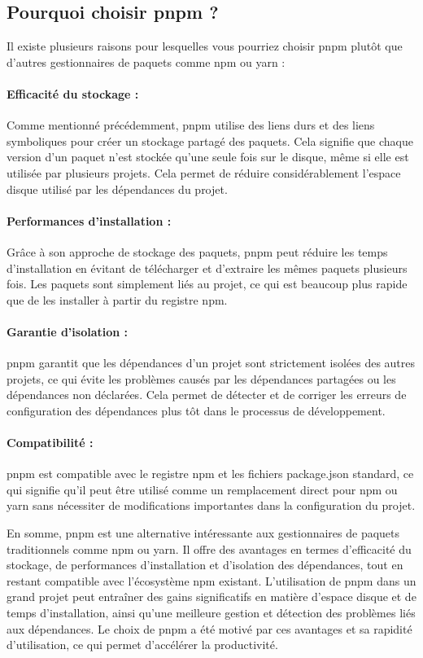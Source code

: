 \subsection{Pourquoi choisir pnpm ?}

Il existe plusieurs raisons pour lesquelles vous pourriez choisir pnpm plutôt que d'autres gestionnaires de paquets comme npm ou yarn :

\paragraph{Efficacité du stockage :} Comme mentionné précédemment, pnpm utilise des liens durs et des liens symboliques pour créer un stockage partagé des paquets. Cela signifie que chaque version d'un paquet n'est stockée qu'une seule fois sur le disque, même si elle est utilisée par plusieurs projets. Cela permet de réduire considérablement l'espace disque utilisé par les dépendances du projet.
\paragraph{Performances d'installation :} Grâce à son approche de stockage des paquets, pnpm peut réduire les temps d'installation en évitant de télécharger et d'extraire les mêmes paquets plusieurs fois. Les paquets sont simplement liés au projet, ce qui est beaucoup plus rapide que de les installer à partir du registre npm.
\paragraph{Garantie d'isolation :} pnpm garantit que les dépendances d'un projet sont strictement isolées des autres projets, ce qui évite les problèmes causés par les dépendances partagées ou les dépendances non déclarées. Cela permet de détecter et de corriger les erreurs de configuration des dépendances plus tôt dans le processus de développement.
\paragraph{Compatibilité :} pnpm est compatible avec le registre npm et les fichiers package.json standard, ce qui signifie qu'il peut être utilisé comme un remplacement direct pour npm ou yarn sans nécessiter de modifications importantes dans la configuration du projet.

En somme, pnpm est une alternative intéressante aux gestionnaires de paquets traditionnels comme npm ou yarn. Il offre des avantages en termes d'efficacité du stockage, de performances d'installation et d'isolation des dépendances, tout en restant compatible avec l'écosystème npm existant. L'utilisation de pnpm dans un grand projet peut entraîner des gains significatifs en matière d'espace disque et de temps d'installation, ainsi qu'une meilleure gestion et détection des problèmes liés aux dépendances. Le choix de pnpm a été motivé par ces avantages et sa rapidité d'utilisation, ce qui permet d'accélérer la productivité.


